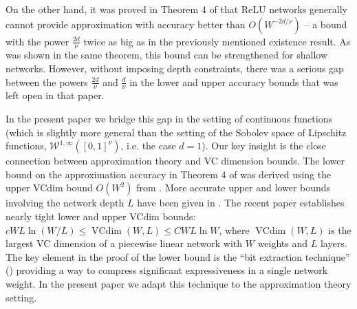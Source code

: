 \documentclass[final, 12pt]{colt2018}
\begin{document}
On the other hand, it was proved in Theorem 4 of \cite{yarotsky2017nn}  that ReLU networks generally cannot provide approximation with accuracy better than $O(W^{-2d/\nu})$ -- a bound with the power $\frac{2d}{\nu}$ twice as big as in the previously mentioned existence result. As was shown in the same theorem, this bound can be strengthened for shallow networks. However, without imposing depth constraints, there was a serious gap between the powers $\frac{2d}{\nu}$ and $\frac{d}{\nu}$ in the lower and upper accuracy bounds that was left open in that paper.

In the present paper we bridge this gap in the setting of continuous functions (which is slightly more general than the setting of the Sobolev space of Lipschitz functions, $\mathcal W^{1,\infty}([0,1]^\nu)$, i.e. the case $d=1$). Our key insight is the close connection between approximation theory and VC dimension bounds. The lower bound on the approximation accuracy in Theorem 4 of \cite{yarotsky2017nn} was derived using the upper VCdim bound $O(W^2)$ from \cite{goldberg1995bounding}. More accurate upper and lower bounds involving the network depth $L$ have been given in \cite{bartlett1998almost,sakurai1999tight}. The recent paper \cite{bartlett2017nearly} establishes nearly tight lower and upper VCdim bounds: $cWL\ln (W/L)\le\operatorname{VCdim}(W,L)\le CWL\ln W$, where $\operatorname{VCdim}(W,L)$ is the largest VC dimension
of a piecewise linear network with $W$ weights and $L$ layers. The key element in the proof of the lower bound is the ``bit extraction technique'' (\cite{bartlett1998almost}) providing a way to compress significant expressiveness in a single network weight.  In the present paper we adapt this technique to the approximation theory setting.
\end{document}
